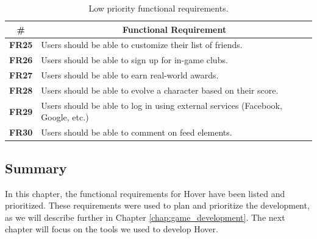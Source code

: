 \begin{table}[H]
    \centering
    \begin{tabularx}{\textwidth}{|>{\small}c|X|}
        \hline
        \textbf{\#} & \multicolumn{1}{c|}{\textbf{Functional Requirement}} \\ \hline
        \textbf{FR25} & Users should be able to customize their list of friends. \\ 
        \textbf{FR26} & Users should be able to sign up for in-game clubs. \\ 
        \textbf{FR27} & Users should be able to earn real-world awards.\\
        \textbf{FR28} & Users should be able to evolve a character based on their score. \\
        \textbf{FR29} & Users should be able to log in using external services (Facebook, Google, etc.) \\ 
        \textbf{FR30} & Users should be able to comment on feed elements.\\ \hline
    \end{tabularx}
    \caption{Low priority functional requirements.}
    \label{tab:FR_low}
    \vspace*{-\baselineskip}
\end{table}

\subsection{Summary}
In this chapter, the functional requirements for Hover have been listed and prioritized. These requirements were used to plan and prioritize the development, as we will describe further in Chapter \ref{chap:game_development}. The next chapter will focus on the tools we used to develop Hover.